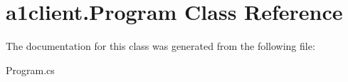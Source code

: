 \hypertarget{classa1client_1_1_program}{}\section{a1client.\+Program Class Reference}
\label{classa1client_1_1_program}


The documentation for this class was generated from the following file\+:\begin{DoxyCompactItemize}
\item 
Program.\+cs\end{DoxyCompactItemize}
